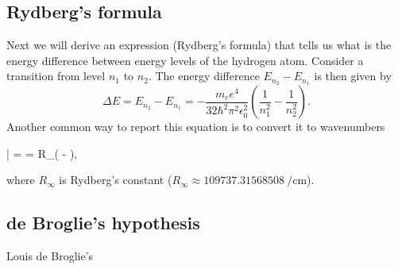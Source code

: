
\subsection{Rydberg's formula}
Next we will derive an expression (Rydberg's formula) that tells us what is the energy difference between energy levels of the hydrogen atom.
Consider a transition from level $n_1$ to $n_2$.
The energy difference $E_{n_2} - E_{n_1}$ is then given by
\begin{equation}
\Delta E = E_{n_2} - E_{n_1} = - \frac{m_e e^4}{32\hbar^2 \pi^2 \epsilon_0^2 } \left(\frac{1}{n_1^2} - \frac{1}{n_2^2} \right).
\end{equation}
Another common way to report this equation is to convert it to wavenumbers
\begin{iequation}
\bar{\nu} =  = R_\infty \left( -  \right),
\end{iequation}
where $R_\infty$ is Rydberg's constant ($R_\infty \approx \SI{109737.31568508}{\per\centi\meter}$).

\subsection{de Broglie's hypothesis}
Louis de Broglie's

